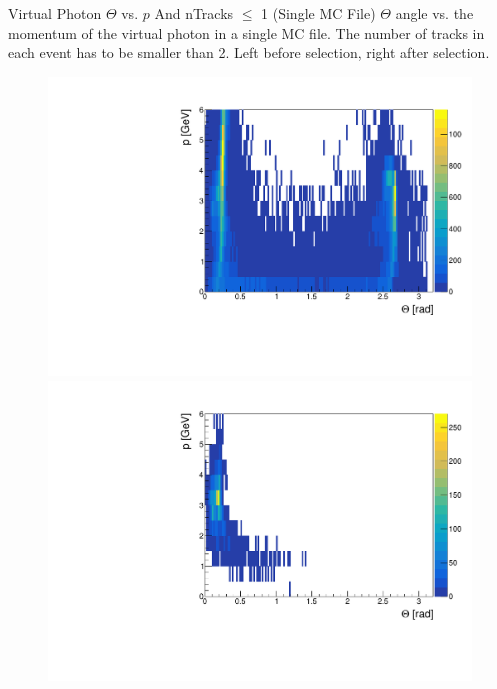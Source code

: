 \documentclass[10pt]{beamer}
\begin{document}
\begin{frame}{Virtual Photon $\Theta$ vs. $p$ And nTracks $\leq$ 1 (Single MC File)}
	$\Theta$ angle vs. the momentum of the virtual photon in a single MC file. The number of tracks in each event has to be smaller than 2. Left before selection, right after selection.
	
	\begin{figure}
		\centering
		\begin{minipage}{.5\textwidth}
			\centering
			\includegraphics[width=\textwidth]{gg/ThetaMgg_BS_nT1}
			
		\end{minipage}%
		\begin{minipage}{.5\textwidth}
			\centering
			\includegraphics[width=\textwidth]{gg/ThetaMgg_AS_nT1}
			
		\end{minipage}
	\end{figure}
	
	
	
\end{frame}
\end{document}
